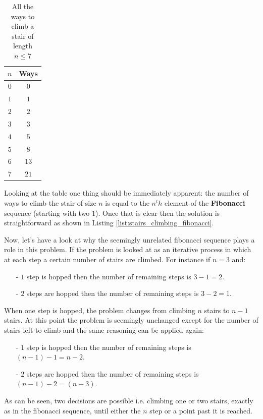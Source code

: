 \begin{table}
	\centering
	\begin{tabular}{|c|c|}
		\hline
		$n$ & \textbf{Ways} \\ \hline
		$0$ & $0$ \\ \hline
		$1$ & $1$ \\ \hline
		$2$ & $2$ \\ \hline
		$3$ & $3$ \\ \hline
		$4$ & $5$ \\ \hline
		$5$ & $8$ \\ \hline
		$6$ & $13$ \\ \hline
		$7$ & $21$ \\ \hline
	\end{tabular}
\label{tab:stairs_climbing_ways_up_tp_7}
\caption{All the ways to climb a stair of length $n \leq 7$ }
\end{table}

Looking at the table one thing should be immediately apparent: the number of ways to climb the stair of size $n$ is equal to the $n^th$ element of the \textbf{Fibonacci} sequence (starting with two $1$).
Once that is clear then the solution is straightforward as shown in Listing \ref{list:stairs_climbing_fibonacci}.



Now, let's have a look at why the seemingly unrelated fibonacci sequence plays a role in this problem. If the problem is looked at as an iterative process in which at each step a certain number of stairs are climbed. For instance if $n = 3$ and:
\begin{itemize}
	\item[-] $1$ step is hopped then the number of remaining steps is $3-1 = 2$. 
	\item[-] $2$ steps are hopped then the number of remaining steps is $3-2 = 1$.
\end{itemize}
When one step is hopped, the problem changes from climbing $n$ stairs to $n-1$ stairs. At this point the problem is seemingly unchanged except for the number of stairs left to climb and the same reasoning can be applied again:
\begin{itemize}
	\item[-] $1$ step is hopped then the number of remaining steps is $(n-1)-1 = n-2$. 
	\item[-] $2$ steps are hopped then the number of remaining steps is $(n-1)-2 = (n-3)$.
\end{itemize}
As can be seen, two decisions are possible i.e. climbing one or two stairs, exactly as in the fibonacci sequence, until either the $n$ step or a point past it is reached.

